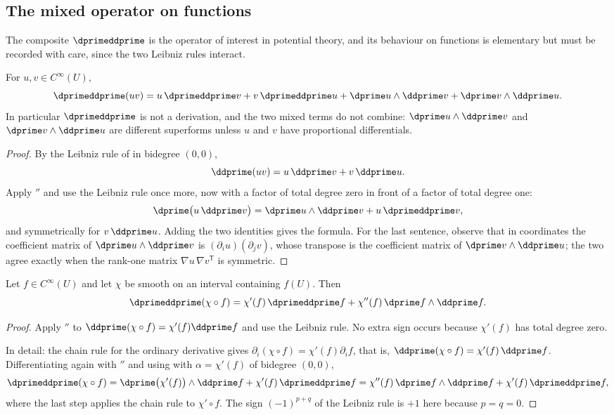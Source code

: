 \subsection{The mixed operator on functions}

The composite $\dprimeddprime$ is the operator of interest in potential
theory, and its behaviour on functions is elementary but must be recorded
with care, since the two Leibniz rules interact.

\begin{lemma}
\label{lem:ch09-ddprime-product}
For $u,v\in C^\infty(U)$,
\[
 \dprimeddprime(uv)
 =u\,\dprimeddprime v+v\,\dprimeddprime u
  +\dprime u\wedge\ddprime v+\dprime v\wedge\ddprime u .
\]
In particular $\dprimeddprime$ is not a derivation, and the two mixed terms
do not combine: $\dprime u\wedge\ddprime v$ and $\dprime v\wedge\ddprime u$
are different superforms unless $u$ and $v$ have proportional differentials.
\end{lemma}

\begin{proof}
By the Leibniz rule of  in
bidegree $(0,0)$,
\[
 \ddprime(uv)=u\,\ddprime v+v\,\ddprime u .
\]
Apply $\dprime$ and use the Leibniz rule once more, now with a factor of
total degree zero in front of a factor of total degree one:
\[
 \dprime\bigl(u\,\ddprime v\bigr)
 =\dprime u\wedge\ddprime v+u\,\dprimeddprime v,
\]
and symmetrically for $v\,\ddprime u$.  Adding the two identities gives the
formula.  For the last sentence, observe that in coordinates the coefficient
matrix of $\dprime u\wedge\ddprime v$ is
$(\partial_iu)(\partial_jv)$, whose transpose is the coefficient matrix of
$\dprime v\wedge\ddprime u$; the two agree exactly when the rank-one matrix
$\nabla u\,\nabla v^{\mathsf T}$ is symmetric.
\end{proof}

\begin{lemma}
\label{lem:superform-composition}
Let $f\in C^\infty(U)$ and let $\chi$ be smooth on an interval containing
$f(U)$. Then
\[
 \dprimeddprime(\chi\circ f)
 =\chi'(f)\,\dprimeddprime f
  +\chi''(f)\,\dprime f\wedge\ddprime f.
\]
\end{lemma}
\begin{proof}
Apply $\dprime$ to
$\ddprime(\chi\circ f)=\chi'(f)\ddprime f$ and use the Leibniz rule.  No
extra sign occurs because $\chi'(f)$ has total degree zero.

In detail: the chain rule for the ordinary derivative gives
$\partial_i(\chi\circ f)=\chi'(f)\partial_if$, that is,
$\ddprime(\chi\circ f)=\chi'(f)\,\ddprime f$.  Differentiating again with
$\dprime$ and using  with
$\alpha=\chi'(f)$ of bidegree $(0,0)$,
\[
 \dprimeddprime(\chi\circ f)
 =\dprime\bigl(\chi'(f)\bigr)\wedge\ddprime f
   +\chi'(f)\,\dprimeddprime f
 =\chi''(f)\,\dprime f\wedge\ddprime f+\chi'(f)\,\dprimeddprime f,
\]
where the last step applies the chain rule to $\chi'\circ f$.  The sign
$(-1)^{p+q}$ of the Leibniz rule is $+1$ here because $p=q=0$.
\end{proof}

